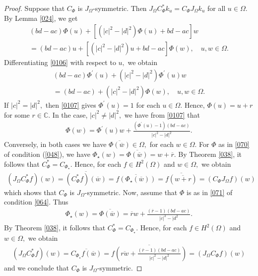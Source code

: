 \documentclass[11pt]{amsart}%
\theoremstyle{definition}
\theoremstyle{remark}
\numberwithin{equation}{section}
\begin{document}
\begin{proof}
Suppose that $C_{\Phi}$ is $J_{\Omega}$-symmetric. Then $J_{\Omega}C_{\Phi
}^{*}k_{u}=C_{\Phi}J_{\Omega}k_{u}$ for all $u\in\Omega.$ By Lemma \ref{024},
we get
\begin{gather}
\label{0106}(bd-ac)\Phi(u)+[(|c|^{2}-|d|^{2})\Phi(u)+bd-ac]w\\
=(bd-ac)u+[(|c|^{2}-|d|^{2})u+bd-ac]\Phi(w), \quad u,w\in\Omega.\nonumber
\end{gather}
Differentiating \eqref{0106} with respect to $u,$ we obtain
\begin{gather}
\label{0107}(bd-ac)\Phi^{\prime}(u)+(|c|^2-|d|^{2})\Phi^{\prime}(u)w\\
=(bd-ac)+(|c|^{2}-|d|^{2})\Phi(w), \quad u, w\in\Omega.\nonumber
\end{gather}
If $|c|^{2}=|d|^{2},$ then \eqref{0107} gives $\Phi^{\prime
}(u)=1$ for each $u\in\Omega.$ Hence, $\Phi(u)=u+r$ for some $r\in\mathbb{C}.$
In the case, $|c|^{2}\neq|d|^{2},$ we have from \eqref{0107} that
\begin{align*}
\Phi(w)=\Phi^{\prime}(u)w+\frac{(\Phi^{\prime}(u)-1)(bd-ac)}{|c|^{2}-|d|^{2}}.
\end{align*}
Conversely, in both cases we have $\overline{\Phi(\overline{w})}\in\Omega,$
for each $w\in\Omega.$ For $\Phi$ as in \eqref{070} of condition (\ref{048}),
we have $\Phi_{\star}(w)=\overline{\Phi(\overline{w})}=w+\overline{r}.$ By
Theorem \ref{038}, it follows that $C_{\Phi}^{*}=C_{\Phi_{\star}}.$ Hence, for
each $f\in H^{2}(\Omega)$ and $w\in\Omega,$ we obtain
\begin{align*}
(J_{\Omega}C_{\Phi}^{*}f)(w)=\overline{(C_{\Phi}^{*}f)(\overline{w}
)}=\overline{f(\Phi_{\star}(\overline{w}))}=\overline{f(\overline{w+r}
)}=(C_{\Phi}J_{\Omega}f)(w)
\end{align*}
which shows that $C_{\Phi}$ is $J_{\Omega}$-symmetric. Now, assume that $\Phi$
is as in \eqref{071} of condition \eqref{064}. Thus
\begin{align*}
\Phi_{\star}(w)=\overline{\Phi(\overline{w})}=\overline{r} w+\frac
{(\overline{r}-1)(bd-ac)}{|c|^{2}-|d^{2}}.
\end{align*}
By Theorem \ref{038}, it follows that $C_{\Phi}^{*}=C_{\Phi_{\star}}.$ Hence,
for each $f\in H^{2}(\Omega)$ and $w\in\Omega,$ we obtain
\begin{align*}
(J_{\Omega}C_{\Phi}^{*}f)(w)=\overline{C_{\Phi_{\star}}f(\overline{w}
)}=\overline{f\left(  \overline{rw}+\frac{(\overline{r}-1)(bd-ac)}
{|c|^{2}-|d|^{2}}\right)  }=(J_{\Omega}C_{\Phi}f)(w)
\end{align*}
and we conclude that $C_{\Phi}$ is $J_{\Omega}$-symmetric.
\end{proof}
\end{document}

